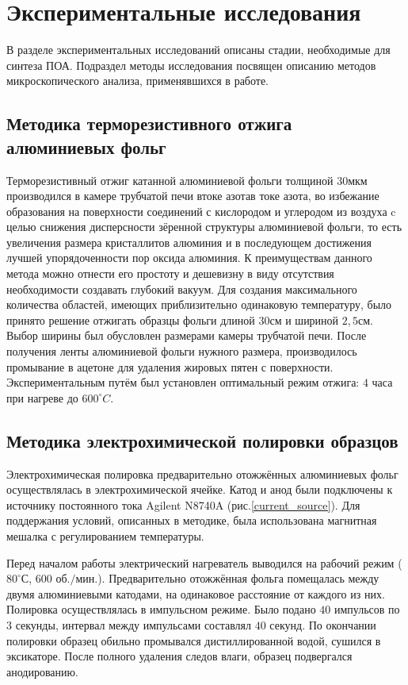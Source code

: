 \section{Экспериментальные исследования}

В разделе экспериментальных исследований описаны стадии, необходимые для синтеза ПОА. Подраздел методы исследования посвящен описанию методов микроскопического анализа, применявшихся в работе.

\subsection{Методика терморезистивного отжига алюминиевых фольг}

Терморезистивный отжиг катанной алюминиевой фольги толщиной $30 \text{мкм}$ производился в камере трубчатой печи втоке азотав токе азота, во избежание образования на поверхности соединений с кислородом и углеродом из воздуха c целью снижения дисперсности зёренной структуры алюминиевой фольги, то есть увеличения размера кристаллитов алюминия и в последующем достижения лучшей упорядоченности пор оксида алюминия. К преимуществам данного метода можно отнести его простоту и дешевизну в виду отсутствия необходимости создавать глубокий вакуум. Для создания максимального количества областей, имеющих приблизительно одинаковую температуру, было принято решение отжигать образцы фольги длиной $30\text{см}$ и шириной $2,5\text{см}$. Выбор ширины был обусловлен размерами камеры трубчатой печи. После получения ленты алюминиевой фольги нужного размера, производилось промывание в ацетоне для удаления жировых пятен с поверхности. Экспериментальным путём был установлен оптимальный режим отжига: $4$ часа при нагреве до $600^{\circ} C$.


\subsection{Методика электрохимической полировки образцов}

Электрохимическая полировка предварительно отожжённых алюминиевых фольг осуществлялась в электрохимической ячейке. Катод и анод были подключены к источнику постоянного тока Agilent N8740A (рис.\ref{current_source}). Для поддержания условий, описанных в методике, была использована магнитная мешалка с регулированием температуры.

Перед началом работы электрический нагреватель выводился на рабочий режим ($80^{\circ}С$, $600$  $\text{об./мин.}$). Предварительно отожжённая фольга помещалась между двумя алюминиевыми катодами, на одинаковое расстояние от каждого из них. Полировка осуществлялась в импульсном режиме. Было подано $40$ импульсов по $3$ секунды, интервал между импульсами составлял $40$ секунд. По окончании полировки образец обильно промывался дистиллированной водой, сушился в эксикаторе. После полного удаления следов влаги, образец подвергался анодированию.

